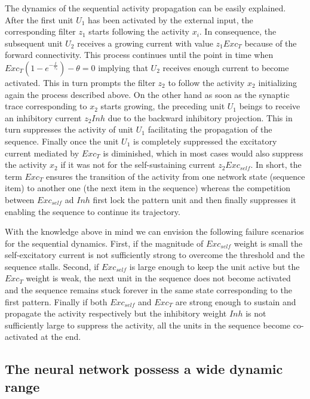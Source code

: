 \documentclass{esannV2}
\begin{document}
The dynamics of the sequential activity propagation can be easily explained. After the first unit $U_1$ has been activated by the external input, the corresponding filter $z_1$ starts following the activity $x_i$. In consequence, the subsequent unit $U_2$ receives a growing current with value $z_1 Exc_T$ because of the forward connectivity. This process continues until the point in time when $Exc_{T}(1 - e^{-\frac{t}{\tau_z}}) - \theta = 0$ implying that $U_2$ receives enough current to become activated. This in turn prompts the filter $z_2$ to follow the activity $x_2$ initializing again the process described above. On the other hand as soon as the synaptic trace corresponding to $x_2$ starts growing, the preceding unit $U_1$ beings to receive an inhibitory current $z_2 Inh$ due to the backward inhibitory projection. This in turn suppresses the activity of unit $U_1$ facilitating the propagation of the sequence. Finally once the unit $U_1$ is completely suppressed the excitatory current mediated by $Exc_T$ is diminished, which in most cases would also suppress the activity $x_2$ if it was not for the self-sustaining current $z_2 Exc_{self}$. In short, the term $Exc_T$ ensures the transition of the activity from one network state (sequence item) to another one (the next item in the sequence) whereas the competition between $Exc_{self}$ ad $Inh$ first lock the pattern unit and then finally suppresses it enabling the sequence to continue its trajectory. 


With the knowledge above in mind we can envision the following  failure scenarios for the sequential dynamics. First, if the magnitude of $Exc_{self}$ weight is small the self-excitatory current is not sufficiently strong to overcome the threshold and the sequence stalls. Second, if $Exc_{self}$ is large enough to keep the unit active but the $Exc_{T}$ weight is weak, the next unit in the sequence does not become activated and the sequence remains stuck forever in the same state corresponding to the first pattern. Finally if both $Exc_{self}$ and $Exc_T$ are strong enough to sustain and propagate the activity respectively but the inhibitory weight $Inh$ is not sufficiently large to suppress the activity, all the units in the sequence become co-activated at the end. 

\subsection{The neural network possess a wide dynamic range}
\end{document}
